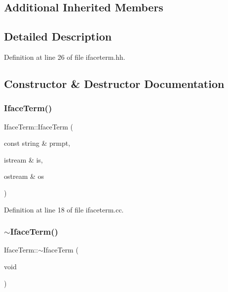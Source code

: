 \subsection*{Additional Inherited Members}


\subsection{Detailed Description}


Definition at line 26 of file ifaceterm.\+hh.



\subsection{Constructor \& Destructor Documentation}
\mbox{\label{class_iface_term_a6eedea34ceeec75017bcb49d512e9b59}} 
\subsubsection{\texorpdfstring{IfaceTerm()}{IfaceTerm()}}
{\footnotesize\ttfamily Iface\+Term\+::\+Iface\+Term (\begin{DoxyParamCaption}\item[{const string \&}]{prmpt,  }\item[{istream \&}]{is,  }\item[{ostream \&}]{os }\end{DoxyParamCaption})}



Definition at line 18 of file ifaceterm.\+cc.

\mbox{\label{class_iface_term_ae86711871edf3c58a9e8a8c463d8cbac}} 
\subsubsection{\texorpdfstring{$\sim$IfaceTerm()}{~IfaceTerm()}}
{\footnotesize\ttfamily Iface\+Term\+::$\sim$\+Iface\+Term (\begin{DoxyParamCaption}\item[{void}]{ }\end{DoxyParamCaption})\hspace{0.3cm}{\ttfamily [virtual]}}



